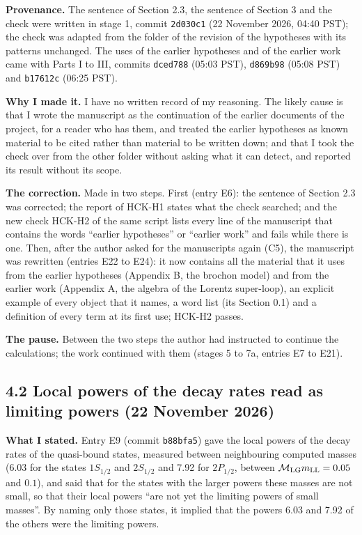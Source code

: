 \documentclass[
  10pt,
]{article}
\begin{document}
\textbf{Provenance.} The sentence of Section 2.3, the sentence of
Section 3 and the check were written in stage 1, commit \texttt{2d030c1}
(22 November 2026, 04:40 PST); the check was adapted from the folder of
the revision of the hypotheses with its patterns unchanged. The uses of
the earlier hypotheses and of the earlier work came with Parts I to III,
commits \texttt{dced788} (05:03 PST), \texttt{d869b98} (05:08 PST) and
\texttt{b17612c} (06:25 PST).

\textbf{Why I made it.} I have no written record of my reasoning. The
likely cause is that I wrote the manuscript as the continuation of the
earlier documents of the project, for a reader who has them, and treated
the earlier hypotheses as known material to be cited rather than
material to be written down; and that I took the check over from the
other folder without asking what it can detect, and reported its result
without its scope.

\textbf{The correction.} Made in two steps. First (entry E6): the
sentence of Section 2.3 was corrected; the report of HCK-H1 states what
the check searched; and the new check HCK-H2 of the same script lists
every line of the manuscript that contains the words ``earlier
hypotheses'' or ``earlier work'' and fails while there is one. Then,
after the author asked for the manuscripts again (C5), the manuscript
was rewritten (entries E22 to E24): it now contains all the material
that it uses from the earlier hypotheses (Appendix B, the brochon model)
and from the earlier work (Appendix A, the algebra of the Lorentz
super-loop), an explicit example of every object that it names, a word
list (its Section 0.1) and a definition of every term at its first use;
HCK-H2 passes.

\textbf{The pause.} Between the two steps the author had instructed to
continue the calculations; the work continued with them (stages 5 to 7a,
entries E7 to E21).

\hypertarget{local-powers-of-the-decay-rates-read-as-limiting-powers-22-november-2026}{%
\subsection{4.2 Local powers of the decay rates read as limiting powers
(22 November
2026)}\label{local-powers-of-the-decay-rates-read-as-limiting-powers-22-november-2026}}

\textbf{What I stated.} Entry E9 (commit \texttt{b88bfa5}) gave the
local powers of the decay rates of the quasi-bound states, measured
between neighbouring computed masses (6.03 for the states \(1S_{1/2}\)
and \(2S_{1/2}\) and 7.92 for \(2P_{1/2}\), between
\(\mathcal M_{\rm LG}m_{\rm LL}=0.05\) and \(0.1\)), and said that for
the states with the larger powers these masses are not small, so that
their local powers ``are not yet the limiting powers of small masses''.
By naming only those states, it implied that the powers 6.03 and 7.92 of
the others were the limiting powers.
\end{document}
